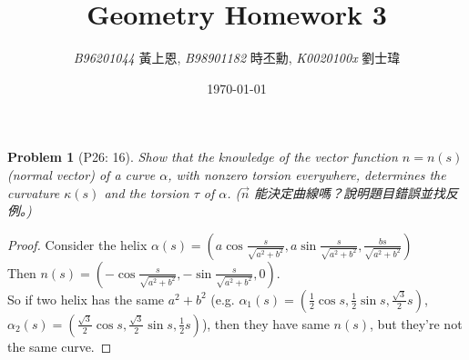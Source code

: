 \documentclass[10pt,a4paper]{article}
\newcommand{\LiHei}{\CJKfamily{lh}}
\newcounter{theProblemCounter}
\newtheorem{problem}[theProblemCounter]{Problem}
\begin{document}
\title{{Geometry Homework 3}}
\author{{\it{B96201044}} {\LiHei 黃上恩}, {\it{B98901182}} {\LiHei 時丕勳}, {\it{K0020100x}} {\LiHei 劉士瑋}}
\date{\today}
\maketitle

\setcounter{theProblemCounter}{2}
\begin{problem}[P26: 16]
Show that the knowledge of the vector function $n=n(s)$ (normal vector) of a curve $\alpha$, with nonzero torsion everywhere, determines the curvature $\kappa(s)$ and the torsion $\tau$ of $\alpha$.  ($\vec{n}$ 能決定曲線嗎？說明題目錯誤並找反例。)
\end{problem}
\begin{proof}
Consider the helix $\alpha(s)=(a\cos{\frac{s}{\sqrt{a^2+b^2}}},a\sin{\frac{s}{\sqrt{a^2+b^2}}},{\frac{bs}{\sqrt{a^2+b^2}}})$\\
Then $n(s)=(-\cos{\frac{s}{\sqrt{a^2+b^2}}},-\sin{\frac{s}{\sqrt{a^2+b^2}}},0)$.\\
So if two helix has the same $a^2+b^2$ (e.g. $\alpha_1(s)=(\frac{1}{2}\cos{s},\frac{1}{2}\sin{s},\frac{\sqrt{3}}{2}s)$, $\alpha_2(s)=(\frac{\sqrt{3}}{2}\cos{s},\frac{\sqrt{3}}{2}\sin{s},\frac{1}{2}s)$), then they have same $n(s)$, but they're not the same curve.
\end{proof}
\end{document}

